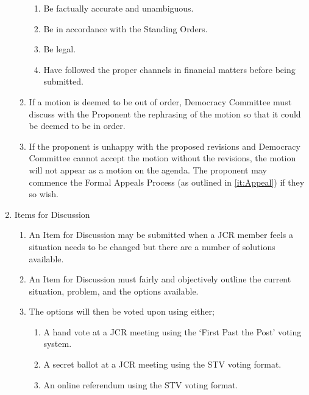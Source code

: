 \begin{enumerate}
\begin{enumerate}
        \begin{enumerate}
            \item Be factually accurate and unambiguous.
            \item Be in accordance with the Standing Orders.
            \item Be legal.
            \item Have followed the proper channels in financial matters before being submitted.
        \end{enumerate}
        \item If a motion is deemed to be out of order, Democracy Committee must discuss with the Proponent
        the rephrasing of the motion so that it could be deemed to be in order.
        \item If the proponent is unhappy with the proposed revisions and Democracy Committee cannot accept the motion without the revisions, the motion will not appear as a motion on the agenda. The proponent may commence the Formal Appeals Process (as outlined in \ref{it:Appeal}) if they so wish.
    \end{enumerate}
    \item Items for Discussion
    \begin{enumerate}
        \item An Item for Discussion may be submitted when a JCR member feels a situation needs to be changed but there are a number of solutions available.
        \item An Item for Discussion must fairly and objectively outline the current situation, problem, and the options available.
        \item The options will then be voted upon using either;
        \begin{enumerate}
            \item A hand vote at a JCR meeting using the ‘First Past the Post’ voting system. 
            \item A secret ballot at a JCR meeting using the STV voting format.
            \item An online referendum using the STV voting format.
        \end{enumerate}
    \end{enumerate}
    
\end{enumerate}

